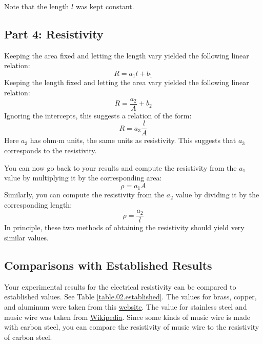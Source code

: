 Note that the length $l$ was kept constant.
%
\subsection{Part 4: Resistivity}
%
Keeping the area fixed and letting the length vary yielded the following linear relation:
\begin{equation}
	R = a_{1} l + b_{1}
\end{equation}
Keeping the length fixed and letting the area vary yielded the following linear relation:
\begin{equation}
	R = \frac{a_{2}}{A} + b_{2}
\end{equation}
Ignoring the intercepts, this suggests a relation of the form:
\begin{equation}
	R = a_{3} \frac{l}{A}
\end{equation}
Here $a_{3}$ has ohm$\cdot$m units, the same units as resistivity. This suggests that $a_{3}$ corresponds to the resistivity.

You can now go back to your results and compute the resistivity from the $a_{1}$ value by multiplying it by the corresponding area:
\begin{equation}
	\rho = a_{1} A
\end{equation}
Similarly, you can compute the resistivity from the $a_{2}$ value by dividing it by the corresponding length:
\begin{equation}
	\rho = \frac{a_{2}}{l}
\end{equation}
In principle, these two methods of obtaining the resistivity should yield very similar values.
%
\subsection{Comparisons with Established Results}
%
Your experimental results for the electrical resistivity can be compared to established values. See Table \ref{table.02.established}. The values for brass, copper, and aluminum were taken from this \href{http://www.radio-electronics.com/info/formulae/resistance/resistivity-table.php}{website}. The value for stainless steel and music wire was taken from \href{https://en.wikipedia.org/wiki/Electrical_resistivity_and_conductivity}{Wikipedia}. Since some kinds of music wire is made with carbon steel, you can compare the resistivity of music wire to the resistivity of carbon steel.
%
